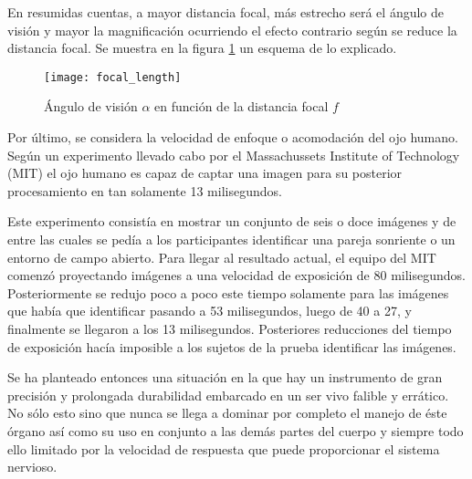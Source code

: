 En resumidas cuentas, a mayor distancia focal, más estrecho será el ángulo de visión y mayor la magnificación ocurriendo el efecto contrario según se reduce la distancia focal. Se muestra en la figura \ref{fig:focal_length} un esquema de lo explicado. 


\begin{figure}[!htb]
\centering
{}
  \texttt{[image: focal\_length]}
  \caption{Ángulo de visión $\alpha$ en función de la distancia focal $f$}\label{fig:focal_length}
\endminipage\hfill

\end{figure}



Por último, se considera la velocidad de enfoque o acomodación del ojo humano. Según un experimento llevado cabo por el Massachussets Institute of Technology (MIT)\cite{mit_experiment}  el ojo humano es capaz de captar una imagen para su posterior procesamiento en tan solamente 13 milisegundos.

Este experimento consistía en  mostrar un conjunto de seis o doce imágenes y de entre las cuales se pedía a los participantes identificar una pareja sonriente o un entorno de campo abierto. 
Para llegar al resultado actual, el equipo del MIT comenzó proyectando imágenes a una velocidad de exposición de 80 milisegundos. Posteriormente se redujo poco a poco este tiempo solamente para las imágenes que había que identificar pasando a 53 milisegundos, luego de 40 a 27, y finalmente se llegaron a los 13 milisegundos. Posteriores reducciones del tiempo de exposición hacía imposible a los sujetos de la prueba identificar las imágenes.


Se ha planteado entonces una situación en la que hay un instrumento de gran precisión y prolongada durabilidad embarcado en un ser vivo falible y errático. No sólo esto sino que nunca se llega a dominar por completo el manejo de éste órgano así como su uso en conjunto a las demás partes del cuerpo y siempre todo ello limitado por la velocidad de respuesta que puede proporcionar el sistema nervioso.


